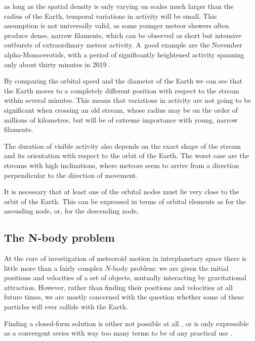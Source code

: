     as long as the spatial density is only varying on scales much larger than the radius of the Earth,
    temporal variations in activity will be small.
    This assumption is not universally valid, as some younger meteor showers often produce dense, narrow filaments,
    which can be observed as short but intensive outbursts of extraordinary meteor activity.
    A~good example are the November alpha-Monocerotids, with a period of significantly
    heightened activity spanning only about thirty minutes in 2019 \citep{CBET4692}.

    By comparing the orbital speed and the diameter of the Earth we can see that the Earth moves
    to a completely different position with respect to the stream within several minutes.
    This means that variations in activity are not going to be significant when crossing an old stream,
    whose radius may be on the order of millions of kilometres, but will be of extreme importance with young, narrow filaments.

    The duration of visible activity also depends on the exact shape of the stream and its orientation with respect to the orbit of the Earth.
    The worst case are the streams with high inclinations, where meteors seem to arrive from a direction perpendicular
    to the direction of movement.



    It is necessary that at least one of the orbital nodes must lie very close to the orbit of the Earth.
    This can be expressed in terms of orbital elements as
    for the ascending node, or, for the descending node,

    \subsection{The N-body problem} \label{msN}
        At the core of investigation of meteoroid motion in interplanetary space
        there is little more than a fairly complex $N$-body problem:
        we are given the initial positions and velocities of a set of objects,
        mutually interacting by gravitational attraction.
        However, rather than finding their positions and velocities at all future times, we are mostly concerned
        with the question whether some of these particles will ever collide with the Earth.

        Finding a closed-form solution is either not possible at all \cite{...}, or is only expressible
        as a convergent series with way too many terms to be of any practical use \citep{beloriszky-1930}.

